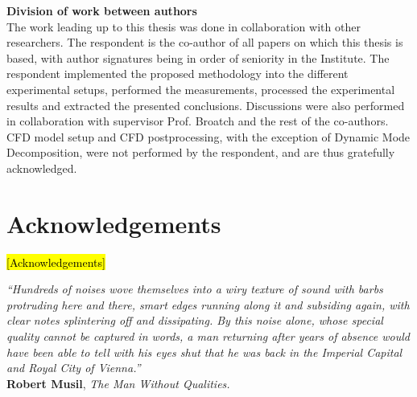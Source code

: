 \documentclass[final,twoside,11pt]{book}
\makeatletter
\numberwithin{equation}{section}
\numberwithin{figure}{chapter}
\numberwithin{table}{chapter}
\def\cleardoublepage{\clearpage\if@twoside \ifodd\c@page\else
  \hbox{}
  \thispagestyle{empty}
  \newpage
  \if@twocolumn\hbox{}\newpage\fi\fi\fi}
\makeatother
\begin{document}
\newpage

{\bfseries\sffamily\Large\noindent Division of work between authors}\\[-1mm]

The work leading up to this thesis was done in collaboration with other researchers. The respondent is the co-author of all papers on which
this thesis is based, with author signatures being in order of seniority in the Institute. The respondent implemented the proposed methodology into the different experimental setups, performed the measurements, processed the experimental results and extracted the presented conclusions. Discussions were also performed in collaboration with supervisor Prof. Broatch and the rest of the co-authors. CFD model setup and CFD postprocessing, with the exception of Dynamic Mode Decomposition, were not performed by the respondent, and are thus gratefully acknowledged.

\cleardoublepage

\chapter*{Acknowledgements}
\hl{[Acknowledgements]}
\cleardoublepage

\null\vspace{2cm}

\begin{flushright}
\begin{minipage}[t]{0.75\textwidth}



\linespread{0.97}\selectfont
{\itshape\small``Hundreds of noises wove themselves into a wiry texture of sound with barbs protruding here and there, smart edges running along it and subsiding again, with clear notes splintering off and dissipating. By this noise alone, whose special quality cannot be captured in words, a man returning after years of absence would have been able to tell with his eyes shut that he was back in the Imperial Capital and Royal City of Vienna.''}\\[-3mm]

{\cabincondensed\small\hfill \textbf{Robert Musil}, \emph{The Man Without Qualities.}}
\end{minipage}
\end{flushright}
\end{document}
